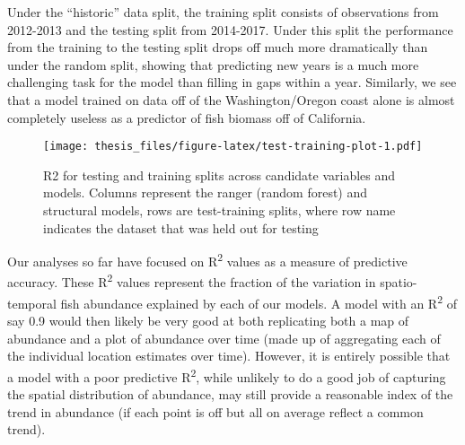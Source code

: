 \documentclass[twoside,12pt,final]{ucthesis-CA2012}
\begin{document}
\begin{ucmainmatter}
Under the ``historic'' data split, the training split consists of
observations from 2012-2013 and the testing split from 2014-2017. Under
this split the performance from the training to the testing split drops
off much more dramatically than under the random split, showing that
predicting new years is a much more challenging task for the model than
filling in gaps within a year. Similarly, we see that a model trained on
data off of the Washington/Oregon coast alone is almost completely
useless as a predictor of fish biomass off of California.
\begin{figure}
\centering
\texttt{[image: thesis\_files/figure-latex/test-training-plot-1.pdf]}
\caption{\label{fig:test-training-plot}R2 for testing and training splits
across candidate variables and models. Columns represent the ranger
(random forest) and structural models, rows are test-training splits,
where row name indicates the dataset that was held out for testing}
\end{figure}
Our analyses so far have focused on R\textsuperscript{2} values as a
measure of predictive accuracy. These R\textsuperscript{2} values
represent the fraction of the variation in spatio-temporal fish
abundance explained by each of our models. A model with an
R\textsuperscript{2} of say 0.9 would then likely be very good at both
replicating both a map of abundance and a plot of abundance over time
(made up of aggregating each of the individual location estimates over
time). However, it is entirely possible that a model with a poor
predictive R\textsuperscript{2}, while unlikely to do a good job of
capturing the spatial distribution of abundance, may still provide a
reasonable index of the trend in abundance (if each point is off but all
on average reflect a common trend).


\end{ucmainmatter}
\end{document}
